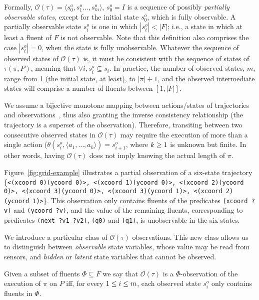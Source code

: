\documentclass[runningheads]{llncs}
\newcommand{\tup}[1]{{\langle #1 \rangle}}
\begin{document}
Formally, $\mathcal{O}(\tau)=\tup{s_0^o,s_1^o \ldots , s_m^o}$, $s_0^o=I$ is a sequence of possibly {\em partially observable states}, except for the initial state $s_0^o$, which is fully observable. A partially observable state $s_i^o$ is one in which $|s_i^o| < |F|$; i.e., a state in which at least a fluent of $F$ is not observable. Note that this definition also comprises the case $|s_i^o| = 0$, when the state is fully unobservable. Whatever the sequence of observed states of $\mathcal{O}(\tau)$ is, it must be consistent with the sequence of states of $\tau(\pi,P)$, meaning that $\forall i, s_i^o \subseteq s_i$. In practice, the number of observed states, $m$, range from 1 (the initial state, at least), to $|\pi|+1$, and the observed intermediate states will comprise a number of fluents between $[1,|F|]$.

We assume a bijective monotone mapping between actions/states of trajectories and observations~\cite{ramirez2009plan}, thus also granting the inverse consistency relationship (the trajectory is a superset of the observation). Therefore, transiting between two consecutive observed states in $\mathcal{O}(\tau)$ may require the execution of more than a single action ($\theta(s_i^o,\tup{a_1,\ldots,a_k})=s_{i+1}^o$, where ${\small k\geq 1}$ is unknown but finite. In other words, having $\mathcal{O}(\tau)$ does not imply knowing the actual length of $\pi$.

Figure~\ref{fig:grid-example} illustrates a partial observation of a six-state trajectory \{{\tt\scriptsize<(xcoord 0)(ycoord 0)>, <(xcoord 1)(ycoord 0)>, <(xcoord 2)(ycoord 0)>, <(xcoord 3)(ycoord 0)>, <(xcoord 3)(ycoord 1)>, <(xcoord 2)(ycoord 1)>}\}. This observation only contains fluents of the predicates {\tt\small (xcoord ?v)} and {\tt\small (ycoord ?v)}, and the value of the remaining fluents, corresponding to predicates {\tt\small (next ?v1 ?v2)}, {\tt\small (q0)} and {\tt\small (q1)}, is unobservable in the six states.

We introduce a particular class of $\mathcal{O}(\tau)$ observations. This new class allows us to distinguish between {\em observable} state variables, whose value may be read from sensors, and {\em hidden} or {\em latent} state variables that cannot be observed.

\begin{definition}
Given a subset of fluents $\Phi\subseteq F$ we say that $\mathcal{O}(\tau)$ is a $\Phi$-observation of the execution of $\pi$ on $P$ iff, for every ${\small 1\leq i\leq m}$, each observed state $s_i^o$ only contains fluents in $\Phi$.
\end{definition}
\end{document}

